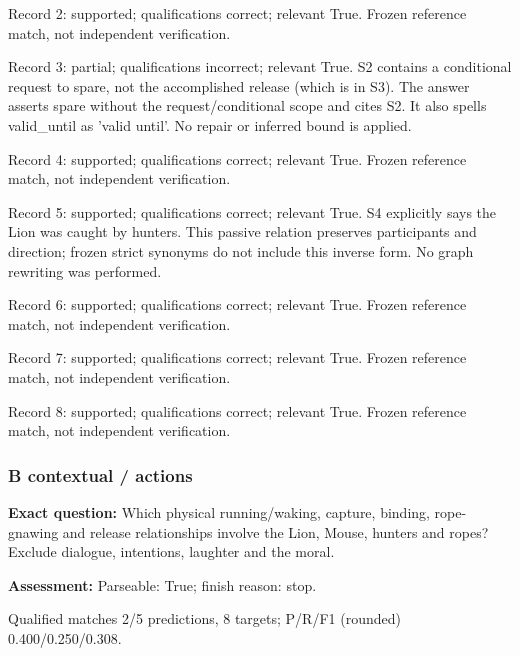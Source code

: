 \noindent Record 2: supported; qualifications correct; relevant True. Frozen reference match, not independent verification.\par\smallskip

\noindent Record 3: partial; qualifications incorrect; relevant True. S2 contains a conditional request to spare, not the accomplished release (which is in S3). The answer asserts spare without the request/conditional scope and cites S2. It also spells valid\_until as 'valid until'. No repair or inferred bound is applied.\par\smallskip

\noindent Record 4: supported; qualifications correct; relevant True. Frozen reference match, not independent verification.\par\smallskip

\noindent Record 5: supported; qualifications correct; relevant True. S4 explicitly says the Lion was caught by hunters. This passive relation preserves participants and direction; frozen strict synonyms do not include this inverse form. No graph rewriting was performed.\par\smallskip

\noindent Record 6: supported; qualifications correct; relevant True. Frozen reference match, not independent verification.\par\smallskip

\noindent Record 7: supported; qualifications correct; relevant True. Frozen reference match, not independent verification.\par\smallskip

\noindent Record 8: supported; qualifications correct; relevant True. Frozen reference match, not independent verification.\par\smallskip

\subsubsection*{B contextual / actions}

\noindent\textbf{Exact question:} Which physical running/waking, capture, binding, rope-gnawing and release relationships involve the Lion, Mouse, hunters and ropes? Exclude dialogue, intentions, laughter and the moral.\par

\noindent\textbf{Assessment:} Parseable: True; finish reason: stop.

Qualified matches 2/5 predictions, 8 targets; P/R/F1 (rounded) 0.400/0.250/0.308.\par

